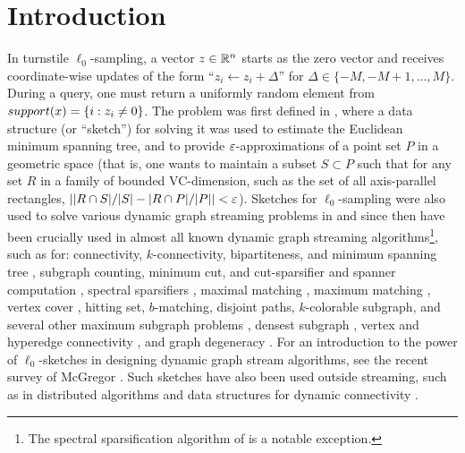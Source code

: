 \section{Introduction}\label{sec:intro}
In turnstile $\ell_0$-sampling, a vector $z\in\mathbb{R}^n$ starts as the zero vector and receives coordinate-wise updates of the form ``$z_i \leftarrow z_i + \Delta$'' for $\Delta\in\{-M,-M+1,\ldots,M\}$. During a query, one must return a uniformly random element from $\mathop{support}(x) = \{i : z_i\neq 0\}$. The problem was first defined in \cite{FrahlingIS08}, where a data structure (or ``sketch'') for solving it was used to estimate the Euclidean minimum spanning tree, and to provide $\varepsilon$-approximations of a point set $P$ in a geometric space (that is, one wants to maintain a subset $S\subset P$ such that for any set $R$ in a family of bounded VC-dimension, such as the set of all axis-parallel rectangles, $||R\cap S|/|S| - |R\cap P|/|P|| < \varepsilon$). Sketches for $\ell_0$-sampling were also used to solve various dynamic graph streaming problems in \cite{AhnGM12a} and since then have been crucially used in almost all known dynamic graph streaming algorithms\footnote{\label{specfootnote}The spectral sparsification algorithm of \cite{KapralovLMMS14} is a notable exception.}, such as for: connectivity, $k$-connectivity, bipartiteness, and minimum spanning tree \cite{AhnGM12a}, subgraph counting, minimum cut, and cut-sparsifier and spanner computation \cite{AhnGM12b}, spectral sparsifiers \cite{AhnGM13}, maximal matching \cite{ChitnisCHM15}, maximum matching \cite{AhnGM12a,BuryS15,Konrad15,AssadiKLY16,ChitnisCEHMMV16,AssadiKL17}, vertex cover \cite{ChitnisCHM15,ChitnisCEHMMV16}, hitting set, $b$-matching, disjoint paths, $k$-colorable subgraph, and several other maximum subgraph problems \cite{ChitnisCEHMMV16}, densest subgraph \cite{BhattacharyaHNT15,McGregorTVV15,EsfandiariHW16}, vertex and hyperedge connectivity \cite{GuhaMT15}, and graph degeneracy \cite{FarachColtonT16}. For an introduction to the power of $\ell_0$-sketches in designing dynamic graph stream algorithms, see the recent survey of McGregor \cite[Section 3]{McGregor14}. Such sketches have also been used outside streaming, such as in distributed algorithms \cite{HegemanPPSS15,Pandurangan0S16} and data structures for dynamic connectivity \cite{KapronKM13,Wang15,GibbKKT15}.



